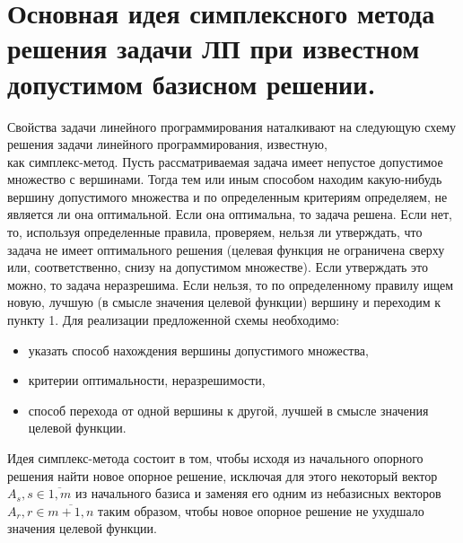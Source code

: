 \documentclass[17pt]{extarticle}
\begin{document}
\section{Основная идея симплексного метода решения задачи ЛП при известном допустимом базисном решении.}
Свойства задачи линейного программирования наталкивают на следующую схему решения задачи линейного программирования,
известную, \\
как симплекс-метод.
Пусть рассматриваемая задача имеет непустое допустимое множество с вершинами.
Тогда тем или иным способом находим какую-нибудь вершину допустимого
множества и по определенным критериям определяем, не является ли она
оптимальной.
Если она оптимальна, то задача решена. Если нет, то, используя определенные правила, проверяем,
нельзя ли утверждать, что задача не имеет оптимального решения (целевая функция не ограничена
сверху или, соответственно, снизу на допустимом множестве).
Если утверждать это можно, то задача неразрешима. Если нельзя, то по определенному правилу ищем новую,
лучшую (в смысле значения целевой функции) вершину и переходим к пункту 1.
Для реализации предложенной схемы необходимо:
\begin{itemize}
    \item указать способ нахождения вершины допустимого множества,
    \item критерии оптимальности, неразрешимости,
    \item способ перехода от одной вершины к другой, лучшей в смысле значения целевой функции.
\end{itemize}

Идея симплекс-метода состоит в том, чтобы исходя из начального опорного решения найти новое опорное
решение, исключая для этого некоторый вектор $A_s, s \in \overline{1,m}$ из начального базиса и заменяя его
одним из небазисных векторов $A_r, r \in \overline{m + 1, n}$
таким образом, чтобы новое опорное решение не ухудшало значения целевой функции.
\end{document}

